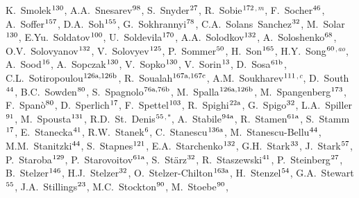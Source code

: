 \begin{flushleft}
K.~Smolek$^\textrm{\scriptsize 130}$,
A.A.~Snesarev$^\textrm{\scriptsize 98}$,
S.~Snyder$^\textrm{\scriptsize 27}$,
R.~Sobie$^\textrm{\scriptsize 172}$$^{,m}$,
F.~Socher$^\textrm{\scriptsize 46}$,
A.~Soffer$^\textrm{\scriptsize 157}$,
D.A.~Soh$^\textrm{\scriptsize 155}$,
G.~Sokhrannyi$^\textrm{\scriptsize 78}$,
C.A.~Solans~Sanchez$^\textrm{\scriptsize 32}$,
M.~Solar$^\textrm{\scriptsize 130}$,
E.Yu.~Soldatov$^\textrm{\scriptsize 100}$,
U.~Soldevila$^\textrm{\scriptsize 170}$,
A.A.~Solodkov$^\textrm{\scriptsize 132}$,
A.~Soloshenko$^\textrm{\scriptsize 68}$,
O.V.~Solovyanov$^\textrm{\scriptsize 132}$,
V.~Solovyev$^\textrm{\scriptsize 125}$,
P.~Sommer$^\textrm{\scriptsize 50}$,
H.~Son$^\textrm{\scriptsize 165}$,
H.Y.~Song$^\textrm{\scriptsize 60}$$^{,ao}$,
A.~Sood$^\textrm{\scriptsize 16}$,
A.~Sopczak$^\textrm{\scriptsize 130}$,
V.~Sopko$^\textrm{\scriptsize 130}$,
V.~Sorin$^\textrm{\scriptsize 13}$,
D.~Sosa$^\textrm{\scriptsize 61b}$,
C.L.~Sotiropoulou$^\textrm{\scriptsize 126a,126b}$,
R.~Soualah$^\textrm{\scriptsize 167a,167c}$,
A.M.~Soukharev$^\textrm{\scriptsize 111}$$^{,c}$,
D.~South$^\textrm{\scriptsize 44}$,
B.C.~Sowden$^\textrm{\scriptsize 80}$,
S.~Spagnolo$^\textrm{\scriptsize 76a,76b}$,
M.~Spalla$^\textrm{\scriptsize 126a,126b}$,
M.~Spangenberg$^\textrm{\scriptsize 173}$,
F.~Span\`o$^\textrm{\scriptsize 80}$,
D.~Sperlich$^\textrm{\scriptsize 17}$,
F.~Spettel$^\textrm{\scriptsize 103}$,
R.~Spighi$^\textrm{\scriptsize 22a}$,
G.~Spigo$^\textrm{\scriptsize 32}$,
L.A.~Spiller$^\textrm{\scriptsize 91}$,
M.~Spousta$^\textrm{\scriptsize 131}$,
R.D.~St.~Denis$^\textrm{\scriptsize 55}$$^{,*}$,
A.~Stabile$^\textrm{\scriptsize 94a}$,
R.~Stamen$^\textrm{\scriptsize 61a}$,
S.~Stamm$^\textrm{\scriptsize 17}$,
E.~Stanecka$^\textrm{\scriptsize 41}$,
R.W.~Stanek$^\textrm{\scriptsize 6}$,
C.~Stanescu$^\textrm{\scriptsize 136a}$,
M.~Stanescu-Bellu$^\textrm{\scriptsize 44}$,
M.M.~Stanitzki$^\textrm{\scriptsize 44}$,
S.~Stapnes$^\textrm{\scriptsize 121}$,
E.A.~Starchenko$^\textrm{\scriptsize 132}$,
G.H.~Stark$^\textrm{\scriptsize 33}$,
J.~Stark$^\textrm{\scriptsize 57}$,
P.~Staroba$^\textrm{\scriptsize 129}$,
P.~Starovoitov$^\textrm{\scriptsize 61a}$,
S.~St\"arz$^\textrm{\scriptsize 32}$,
R.~Staszewski$^\textrm{\scriptsize 41}$,
P.~Steinberg$^\textrm{\scriptsize 27}$,
B.~Stelzer$^\textrm{\scriptsize 146}$,
H.J.~Stelzer$^\textrm{\scriptsize 32}$,
O.~Stelzer-Chilton$^\textrm{\scriptsize 163a}$,
H.~Stenzel$^\textrm{\scriptsize 54}$,
G.A.~Stewart$^\textrm{\scriptsize 55}$,
J.A.~Stillings$^\textrm{\scriptsize 23}$,
M.C.~Stockton$^\textrm{\scriptsize 90}$,
M.~Stoebe$^\textrm{\scriptsize 90}$,

\end{flushleft}
